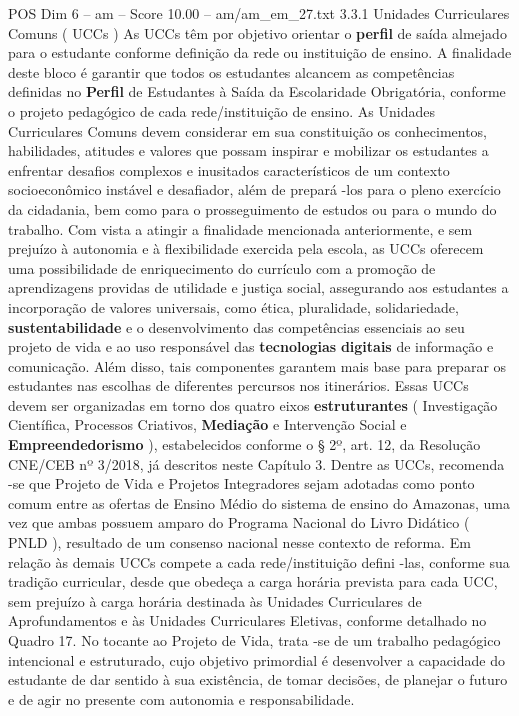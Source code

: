 \begin{textsample}{POS Dim 6 – am – Score 10.00 – am/am\_em\_27.txt}  \label{ex:f6_pos_261}
3.3.1 Unidades Curriculares Comuns ( UCCs ) As UCCs têm por objetivo orientar o \textbf{perfil} de saída almejado para o estudante conforme definição da rede ou instituição de ensino.
A finalidade deste bloco é garantir que todos os estudantes alcancem as competências definidas no \textbf{Perfil} de Estudantes à Saída da Escolaridade Obrigatória, conforme o projeto pedagógico de cada rede/instituição de ensino.
As Unidades Curriculares Comuns devem considerar em sua constituição os conhecimentos, habilidades, atitudes e valores que possam inspirar e mobilizar os estudantes a enfrentar desafios complexos e inusitados característicos de um contexto socioeconômico instável e desafiador, além de prepará -los para o pleno exercício da cidadania, bem como para o prosseguimento de estudos ou para o mundo do trabalho.
Com vista a atingir a finalidade mencionada anteriormente, e sem prejuízo à autonomia e à flexibilidade exercida pela escola, as UCCs oferecem uma possibilidade de enriquecimento do currículo com a promoção de aprendizagens providas de utilidade e justiça social, assegurando aos estudantes a incorporação de valores universais, como ética, pluralidade, solidariedade, \textbf{sustentabilidade} e o desenvolvimento das competências essenciais ao seu projeto de vida e ao uso responsável das \textbf{tecnologias} \textbf{digitais} de informação e comunicação.
Além disso, tais componentes garantem mais base para preparar os estudantes nas escolhas de diferentes percursos nos itinerários.
Essas UCCs devem ser organizadas em torno dos quatro eixos \textbf{estruturantes} ( Investigação Científica, Processos Criativos, \textbf{Mediação} e Intervenção Social e \textbf{Empreendedorismo} ), estabelecidos conforme o § 2º, art. 12, da Resolução CNE/CEB nº 3/2018, já descritos neste Capítulo 3.
Dentre as UCCs, recomenda -se que Projeto de Vida e Projetos Integradores sejam adotadas como ponto comum entre as ofertas de Ensino Médio do sistema de ensino do Amazonas, uma vez que ambas possuem amparo do Programa Nacional do Livro Didático ( PNLD ), resultado de um consenso nacional nesse contexto de reforma.
Em relação às demais UCCs compete a cada rede/instituição defini -las, conforme sua tradição curricular, desde que obedeça a carga horária prevista para cada UCC, sem prejuízo à carga horária destinada às Unidades Curriculares de Aprofundamentos e às Unidades Curriculares Eletivas, conforme detalhado no Quadro 17.
No tocante ao Projeto de Vida, trata -se de um trabalho pedagógico intencional e estruturado, cujo objetivo primordial é desenvolver a capacidade do estudante de dar sentido à sua existência, de tomar decisões, de planejar o futuro e de agir no presente com autonomia e responsabilidade.

\end{textsample}
